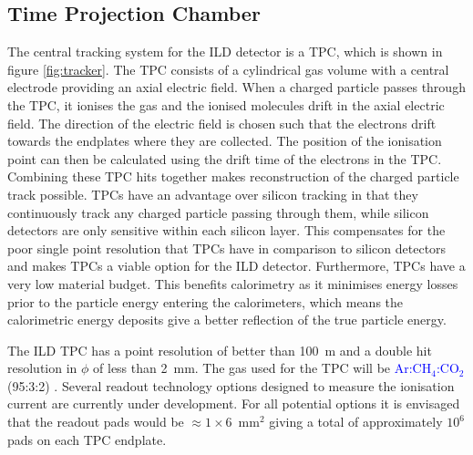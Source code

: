 
\subsection{Time Projection Chamber}
The central tracking system for the ILD detector is a TPC, which is shown in figure \ref{fig:tracker}.  The TPC consists of a cylindrical gas volume with a central electrode providing an axial electric field.  When a charged particle passes through the TPC, it ionises the gas and the ionised molecules drift in the axial electric field.  The direction of the electric field is chosen such that the electrons drift towards the endplates where they are collected.  The position of the ionisation point can then be calculated using the drift time of the electrons in the TPC.  Combining these TPC hits together makes reconstruction of the charged particle track possible.  TPCs have an advantage over silicon tracking in that they continuously track any charged particle passing through them, while silicon detectors are only sensitive within each silicon layer.  This compensates for the poor single point resolution that TPCs have in comparison to silicon detectors and makes TPCs a viable option for the ILD detector.  Furthermore, TPCs have a very low material budget.  This benefits calorimetry as it minimises energy losses prior to the particle energy entering the calorimeters, which means the calorimetric energy deposits give a better reflection of the true particle energy.  

The ILD TPC has a point resolution of better than 100~{\mu}m and a double hit resolution in $\phi$ of less than 2~mm.  The gas used for the TPC will be \textcolor{blue}{Ar:$\text{CH}_4$:$\text{CO}_{2}$} (95:3:2) \cite{arXiv:1006.3396}.  Several readout technology options designed to measure the ionisation current are currently under development.  For all potential options it is envisaged that the readout pads would be $\approx 1 \times 6$~$\text{mm}^{2}$ giving a total of approximately $10^{6}$ pads on each TPC endplate.

